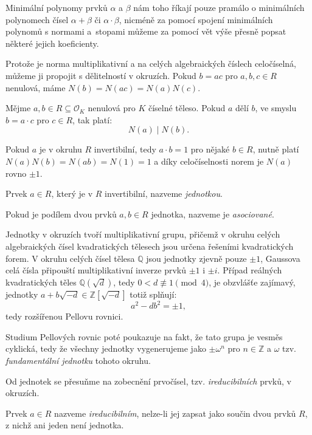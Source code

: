 \documentclass[12pt]{report}
\begin{document}
Minimální polynomy prvků $\alpha$ a $\beta$ nám toho říkají pouze pramálo o minimálních polynomech čísel $\alpha+\beta$ či $\alpha \cdot \beta$, nicméně za pomocí spojení minimálních polynomů s normami a~stopami můžeme za pomocí vět výše přesně popsat některé jejich koeficienty.

Protože je norma multiplikativní a na celých algebraických číslech celočíselná, můžeme ji propojit s dělitelností v okruzích. Pokud $b = ac$ pro $a,b,c \in R$ nenulová, máme $N(b) = N(ac) = N(a)N(c)$.
\begin{veta}\label{normalni}
Mějme $a,b \in R \subseteq \mathcal{O}_K$ nenulová pro $K$ číselné těleso. Pokud $a$ dělí $b$, ve smyslu $b = a \cdot c$ pro $c \in R$, tak platí:
\begin{equation*}
N(a) \mid N(b).
\end{equation*}
\end{veta}

Pokud $a$ je v okruhu $R$ invertibilní, tedy $a\cdot b = 1$ pro nějaké $b \in R$, nutně platí $N(a)N(b) = N(ab) = N(1) = 1$ a díky celočíselnosti norem je $N(a)$ rovno $\pm 1$. 
\begin{definice}
Prvek $a \in R$, který je v $R$ invertibilní, nazveme \textit{jednotkou}.
\end{definice}

\begin{definice}
Pokud je podílem dvou prvků $a,b \in R$ jednotka, nazveme je \textit{asociované}.
\end{definice}

Jednotky v okruzích tvoří multiplikativní grupu, přičemž v okruhu celých algebraických čísel kvadratických tělesech jsou určena řešeními kvadratických forem. V okruhu celých čísel tělesa $\mathbb{Q}$ jsou jednotky zjevně pouze $\pm 1$, Gaussova celá čísla připouští multiplikativní inverze prvků $\pm 1$ i $\pm i$. Případ reálných kvadratických těles $\mathbb{Q}(\sqrt{d})$, tedy $0 < d \not\equiv 1 \pmod{4}$, je obzvlášťe zajímavý, jednotky $a+b\sqrt{-d} \in \mathbb{Z}[\sqrt{-d}]$ totiž splňují:
\begin{equation*}
a^2 - d b^2 = \pm 1,
\end{equation*}
tedy rozšířenou Pellovu rovnici.

Studium Pellových rovnic \cite[2. díl]{Prase} poté poukazuje na fakt, že tato grupa je vesměs cyklická, tedy že všechny jednotky vygenerujeme jako $\pm \omega^n$ pro $n \in \mathbb{Z}$ a $\omega$ tzv. \textit{fundamentální jednotku} tohoto okruhu.

Od jednotek se přesuňme na zobecnění prvočísel, tzv. \textit{ireducibilních} prvků, v okruzích. 
\begin{definice}
Prvek $a \in R$ nazveme \textit{ireducibilním}, nelze-li jej zapsat jako součin dvou prvků $R$, z nichž ani jeden není jednotka.
\end{definice}
\end{document}

